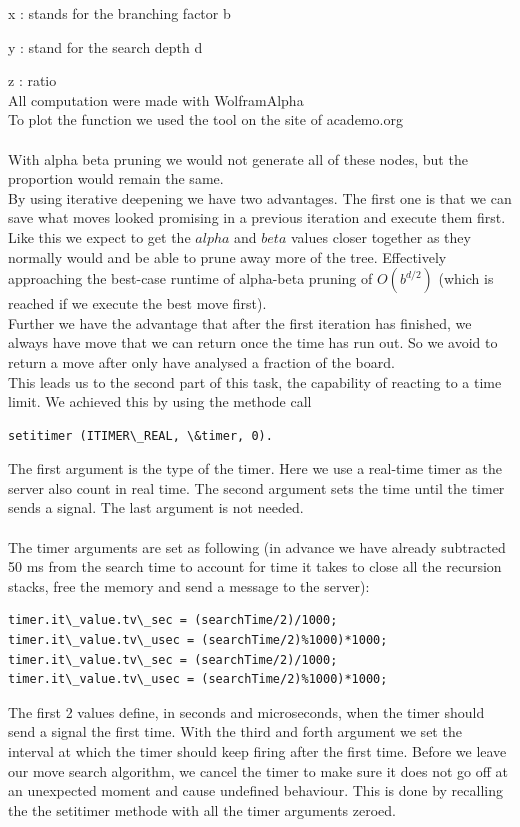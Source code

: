 x : stands for the branching factor b

y : stand for the search depth d

z : ratio\\
\color{gray}
All computation were made with WolframAlpha\\
To plot the function we used the tool on the site of academo.org
\color{black}
\\\\
With alpha beta pruning we would not generate all of these nodes, but the proportion would remain the same.\\

By using iterative deepening we have two advantages. The first one is that we can save what moves looked promising in a previous iteration and execute them first. Like this we expect to get the $alpha$ and $beta$ values closer together as they normally would and be able to prune away more of the tree. Effectively approaching the best-case runtime of alpha-beta pruning of $O(b^{d/2})$ (which is reached if we execute the best move first).\\
Further we have the advantage that after the first iteration has finished, we always have move that we can return once the time has run out. So we avoid to return a move after only have analysed a fraction of the board.\\

This leads us to the second part of this task, the capability of reacting to a time limit. 
We achieved this by using the methode call
\begin{lstlisting}[frame=none, numbers=none]
setitimer (ITIMER\_REAL, \&timer, 0).
\end{lstlisting}
The first argument is the type of the timer. Here we use a real-time timer as the server also count in real time. 
The second argument sets the time until the timer sends a signal. The last argument is not needed.\\\\
The timer arguments are set as following (in advance we have already subtracted 50 ms from the search time to account for time it takes to close all the recursion stacks, free the memory and send a message to the server):
\begin{lstlisting}[frame=none, numbers=none]
timer.it\_value.tv\_sec = (searchTime/2)/1000;
timer.it\_value.tv\_usec = (searchTime/2)%1000)*1000;
timer.it\_value.tv\_sec = (searchTime/2)/1000;
timer.it\_value.tv\_usec = (searchTime/2)%1000)*1000;
\end{lstlisting}
The first 2 values define, in seconds and microseconds, when the timer should send a signal the first time. 
With the third and forth argument we set the interval at which the timer should keep firing after the first time. 
Before we leave our move search algorithm, we cancel the timer to make sure it does not go off at an unexpected moment and cause undefined behaviour. This is done by recalling the the setitimer methode with all the timer arguments zeroed.\\

